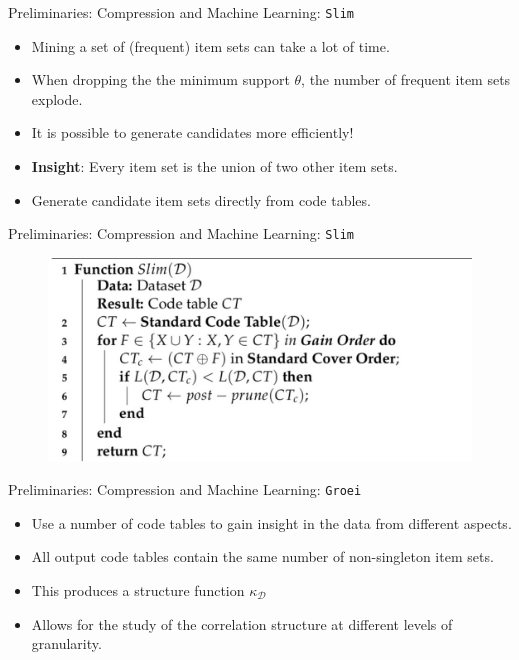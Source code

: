 \documentclass{beamer}
\newcommand{\dataset}{\mathcal{D}}
\newcommand{\groei}{\texttt{Groei}}
\begin{document}
\begin{frame}{Preliminaries: Compression and Machine Learning: \texttt{Slim}}
\begin{itemize}
	\item Mining a set of (frequent) item sets can take a lot of time.
	\item When dropping the the minimum support $\theta$, the number of frequent item sets explode.
	\item It is possible to generate candidates more efficiently!
	\item \textbf{Insight}: Every item set is the union of two other item sets.
	\item Generate candidate item sets directly from code tables.
\end{itemize}
\end{frame}

\begin{frame}{Preliminaries: Compression and Machine Learning: \texttt{Slim}}
\begin{figure}[H]
  \centering
   \includegraphics[width=\textwidth]{img/slim}
\end{figure}
\end{frame}

\begin{frame}{Preliminaries: Compression and Machine Learning: \groei}
\begin{itemize}
	\item Use a number of code tables to gain insight in the data from different aspects.
	\item All output code tables contain the same number of non-singleton item sets.
	\item This produces a structure function $\kappa_\dataset$
	\item Allows for the study of the correlation structure at different levels of granularity.
\end{itemize}
\end{frame}
\end{document}

